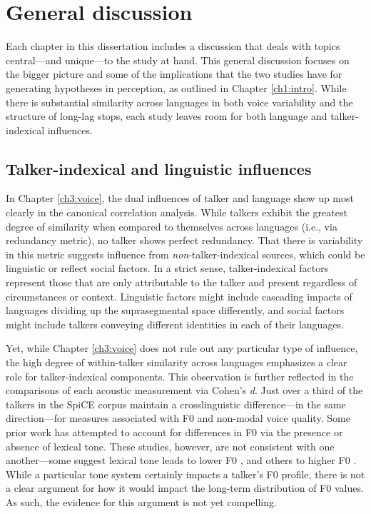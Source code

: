 \section{General discussion}\label{ch5:sec:discussion}

Each chapter in this dissertation includes a discussion that deals with topics central---and unique---to the study at hand. This general discussion focuses on the bigger picture and some of the implications that the two studies have for generating hypotheses in perception, as outlined in Chapter \ref{ch1:intro}. While there is substantial similarity across languages in both voice variability and the structure of long-lag stops, each study leaves room for both language and talker-indexical influences. 

\subsection{Talker-indexical and linguistic influences}

In Chapter \ref{ch3:voice}, the dual influences of talker and language show up most clearly in the canonical correlation analysis. While talkers exhibit the greatest degree of similarity when compared to themselves across languages (i.e., via redundancy metric), no talker shows perfect redundancy. That there is variability in this metric suggests influence from \textit{non}-talker-indexical sources, which could be linguistic or reflect social factors. In a strict sense, talker-indexical factors represent those that are only attributable to the talker and present regardless of circumstances or context. Linguistic factors might include cascading impacts of languages dividing up the suprasegmental space differently, and social factors might include talkers conveying different identities in each of their languages. 

Yet, while Chapter \ref{ch3:voice} does not rule out any particular type of influence, the high degree of within-talker similarity across languages emphasizes a clear role for talker-indexical components. This observation is further reflected in the comparisons of each acoustic measurement via Cohen's \textit{d}. Just over a third of the talkers in the SpiCE corpus maintain a crosslinguistic difference---in the same direction---for measures associated with F0 and non-modal voice quality. Some prior work has attempted to account for differences in F0 via the presence or absence of lexical tone. These studies, however, are not consistent with one another---some suggest lexical tone leads to lower F0 \citep{ng_2012_ltas}, and others to higher F0 \citep{lee_2017_bilingual, keating_2012_f0}. While a particular tone system certainly impacts a talker's F0 profile, there is not a clear argument for how it would impact the long-term distribution of F0 values. As such, the evidence for this argument is not yet compelling. 

